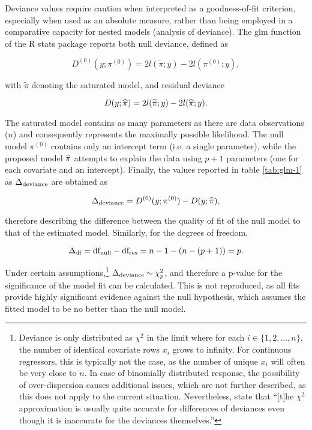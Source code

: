 Deviance values require caution when interpreted as a goodness-of-fit criterion, especially when used as an absolute measure, rather than being employed in a comparative capacity for nested models (analysis of deviance). The glm function of the R stats package reports both null deviance, defined as

\begin{equation}
  D^{(0)}(y; \pi^{(0)}) = 2l(\widetilde{\pi}; y) - 2l(\pi^{(0)}; y),
\end{equation}

with $\widetilde{\pi}$ denoting the saturated model, and residual deviance

\begin{equation}
  D(y; \widehat{\pi}) = 2l(\widetilde{\pi}; y) - 2l(\widehat{\pi}; y).
\end{equation}

The saturated model contains as many parameters as there are data observations ($n$) and consequently represents the maximally possible likelihood. The null model $\pi^{(0)}$ contains only an intercept term (i.e. a single parameter), while the proposed model $\widehat{\pi}$ attempts to explain the data using $p+1$ parameters (one for each covariate and an intercept). Finally, the values reported in table \ref{tab:glm-1} as $\Delta\textsubscript{deviance}$ are obtained as

\begin{equation}
  \Delta\textsubscript{deviance} = D^{(0)}(y; \pi^{(0)}) - D(y; \widehat{\pi}),
\end{equation}

therefore describing the difference between the quality of fit of the null model to that of the estimated model. Similarly, for the degrees of freedom, 

\begin{equation}
  \Delta\textsubscript{df} = \text{df}_\text{null} - \text{df}_\text{res} = n-1 -(n-(p+1)) = p.
\end{equation}

Under certain assumptions,\footnote{Deviance is only distributed as $\chi^2$ in the limit where for each $i \in \{1, 2, \dotsc, n\}$, the number of identical covariate rows $x_i$ grows to infinity. For continuous regressors, this is typically not the case, as the number of unique $x_i$ will often be very close to $n$. In case of binomially distributed response, the possibility of over-dispersion causes additional issues, which are not further described, as this does not apply to the current situation. Nevertheless, \citeauthor{Nelder1972} state that ``[t]he $\chi^2$ approximation is usually quite accurate for differences of deviances even though it is inaccurate for the deviances themselves.''} $\Delta\textsubscript{deviance} \mathbin{\sim} \chi^2_p$, and therefore a p-value for the significance of the model fit can be calculated. This is not reproduced, as all fits provide highly significant evidence against the null hypothesis, which assumes the fitted model to be no better than the null model.

